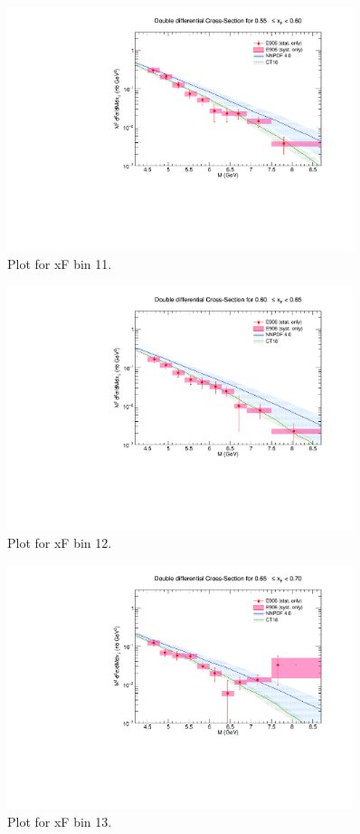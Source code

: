 \begin{figure}[p]
\centering
\includegraphics[width=0.9\textwidth]{./XSecPlots/LH2_11_roofit.pdf}
\caption{Plot for xF bin 11.}
\end{figure}
\clearpage

\begin{figure}[p]
\centering
\includegraphics[width=0.9\textwidth]{./XSecPlots/LH2_12_roofit.pdf}
\caption{Plot for xF bin 12.}
\end{figure}
\clearpage

\begin{figure}[p]
\centering
\includegraphics[width=0.9\textwidth]{./XSecPlots/LH2_13_roofit.pdf}
\caption{Plot for xF bin 13.}
\end{figure}
\clearpage


